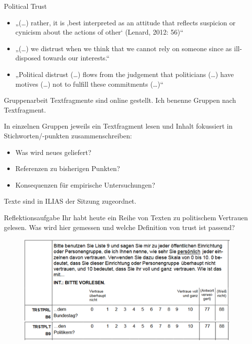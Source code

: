 \documentclass[11pt]{beamer}
\begin{document}
\begin{frame}[t]{Political Trust}
\begin{itemize}
	\item „(…) rather, it is ‚best interpreted as an attitude that reflects suspicion or cynicism about the actions of other‘ (Lenard, 2012: 56)“ \parencite[457]{Festenstein2019}
	\item „(…) we distrust when we think that we cannot rely on someone since as ill-disposed towards our interests.“ \parencite[457]{Festenstein2019}
	\item „Political distrust (…) flows from the judgement that politicians (…) have motives (…) not to fulfill these commitments (…)“ \parencite[457]{Festenstein2019}

\end{itemize}

\end{frame}

\begin{frame}[t]{Gruppenarbeit}
Textfragmente sind online gestellt. Ich benenne Gruppen nach Textfragment.

In einzelnen Gruppen jeweils ein Textfragment lesen und Inhalt fokussiert in Stichworten/-punkten zusammenschreiben:

\begin{itemize}
	\item Was wird neues geliefert?
	\item Referenzen zu bisherigen Punkten?
	\item Konsequenzen für empirische Untersuchungen?
\end{itemize}

Texte sind in ILIAS der Sitzung zugeordnet.

\end{frame}

\begin{frame}[t]{Reflektionsaufgabe}
Ihr habt heute ein Reihe von Texten zu politischem Vertrauen gelesen. Was wird hier gemessen und welche Definition von trust ist passend?

\begin{center}
	\begin{figure}[ht]
		\includegraphics[width=\textwidth]{pics/s5-1.png}
	\end{figure}
\end{center}

\end{frame}
\end{document}
